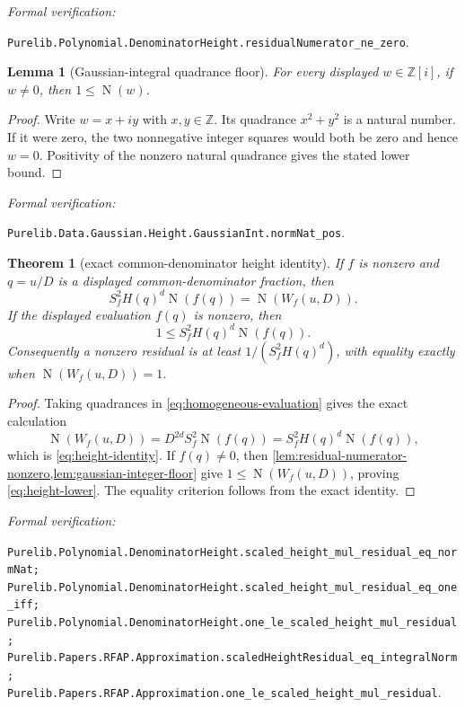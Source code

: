 \documentclass[11pt]{article}
\newtheorem{theorem}{Theorem}[section]
\newtheorem{lemma}[lemma]{Lemma}
\newcommand{\Zi}{\mathbb{Z}[i]}
\newcommand{\Z}{\mathbb{Z}}
\newcommand{\Norm}[1]{\operatorname{N}\!\left(#1\right)}
\newcommand{\leanref}[1]{\par\smallskip\noindent
  \emph{Formal verification:}\par\nobreak
  {\raggedright\nolinkurl{#1}.\par}}
\begin{document}
\leanref{Purelib.Polynomial.DenominatorHeight.residualNumerator_ne_zero}

\begin{lemma}[Gaussian-integral quadrance floor]
\label{lem:gaussian-integer-floor}
For every displayed $w\in\Zi$, if $w\ne0$, then $1\le\Norm w$.
\end{lemma}

\begin{proof}
Write $w=x+iy$ with $x,y\in\Z$.  Its quadrance $x^2+y^2$ is a natural
number.  If it were zero, the two nonnegative integer squares would both be
zero and hence $w=0$.  Positivity of the nonzero natural quadrance gives the
stated lower bound.
\end{proof}

\leanref{Purelib.Data.Gaussian.Height.GaussianInt.normNat_pos}

\begin{theorem}[exact common-denominator height identity]
\label{lem:height-lower}
If $f$ is nonzero and $q=u/D$ is a displayed common-denominator fraction,
then
\begin{equation}
\label{eq:height-identity}
 S_f^2H(q)^d\Norm{f(q)}=\Norm{W_f(u,D)}.
\end{equation}
If the displayed evaluation $f(q)$ is nonzero, then
\begin{equation}
\label{eq:height-lower}
                 1\le S_f^2H(q)^d\Norm{f(q)}.
\end{equation}
Consequently a nonzero residual is at least
$1/(S_f^2H(q)^d)$, with equality exactly when $\Norm{W_f(u,D)}=1$.
\end{theorem}

\begin{proof}
Taking quadrances in \eqref{eq:homogeneous-evaluation} gives the exact
calculation
\[
 \Norm{W_f(u,D)}=D^{2d}S_f^2\Norm{f(q)}
   =S_f^2H(q)^d\Norm{f(q)},
\]
which is \eqref{eq:height-identity}.  If $f(q)\ne0$, then
\cref{lem:residual-numerator-nonzero,lem:gaussian-integer-floor} give
$1\le\Norm{W_f(u,D)}$, proving \eqref{eq:height-lower}.  The equality
criterion follows from the exact identity.
\end{proof}

\leanref{Purelib.Polynomial.DenominatorHeight.scaled_height_mul_residual_eq_normNat;
Purelib.Polynomial.DenominatorHeight.scaled_height_mul_residual_eq_one_iff;
Purelib.Polynomial.DenominatorHeight.one_le_scaled_height_mul_residual;
Purelib.Papers.RFAP.Approximation.scaledHeightResidual_eq_integralNorm;
Purelib.Papers.RFAP.Approximation.one_le_scaled_height_mul_residual}
\end{document}
